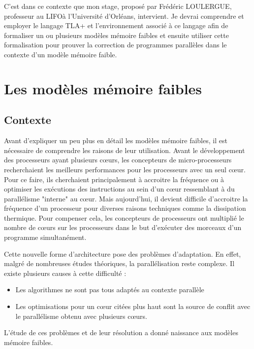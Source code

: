 \documentclass[12pt,a4paper]{article}
\begin{document}
C'est dans ce contexte que mon stage, proposé par Frédéric LOULERGUE, professeur au LIFO\footnotemark[1] à l'Université d'Orléans, intervient. Je devrai comprendre et employer le langage TLA+ \cite{Lamport:2002:SST:579617} et l'environnement associé à ce langage afin de formaliser un ou plusieurs modèles mémoire faibles et ensuite utiliser cette formalisation pour prouver la correction de programmes parallèles dans le contexte d'un modèle mémoire faible. 
 

\section{Les modèles mémoire faibles}

\subsection{Contexte}

Avant d'expliquer un peu plus en détail les modèles mémoire faibles, il est nécessaire de comprendre les raisons de leur utilisation. Avant le développement des processeurs ayant plusieurs cœurs, les concepteurs de micro-processeurs recherchaient les meilleurs performances pour les processeurs avec un seul cœur. Pour ce faire, ils cherchaient principalement à accroitre la fréquence ou à optimiser les exécutions des instructions au sein d'un cœur ressemblant à du parallélisme "interne" au cœur. Mais aujourd'hui, il devient difficile d'accroitre la fréquence d'un processeur pour diverses raisons techniques comme la dissipation thermique. Pour compenser cela, les concepteurs de processeurs ont multiplié le nombre de cœurs sur les processeurs dans le but d'exécuter des morceaux d'un programme simultanément.

Cette nouvelle forme d'architecture pose des problèmes d'adaptation. En effet, malgré de nombreuses études théoriques, la parallélisation reste complexe. Il existe plusieurs causes à cette difficulté :
\begin{itemize}
	\item Les algorithmes ne sont pas tous adaptés au contexte parallèle
	\item Les optimisations pour un cœur citées plus haut sont la source de conflit avec le parallélisme obtenu avec plusieurs cœurs. 
\end{itemize}
L'étude de ces problèmes et de leur résolution a donné naissance aux modèles mémoire faibles.
\end{document}
